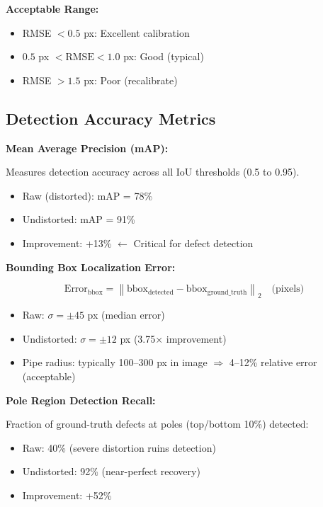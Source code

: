 \documentclass[11pt,a4paper,oneside]{article}
\begin{document}
\textbf{Acceptable Range:}
\begin{itemize}
    \item RMSE $< 0.5$ px: Excellent calibration
    \item $0.5$ px $< \text{RMSE} < 1.0$ px: Good (typical)
    \item RMSE $> 1.5$ px: Poor (recalibrate)
\end{itemize}

\subsection{Detection Accuracy Metrics}

\textbf{Mean Average Precision (mAP):}

Measures detection accuracy across all IoU thresholds (0.5 to 0.95).

\begin{itemize}
    \item Raw (distorted): mAP = 78\%
    \item Undistorted: mAP = 91\%
    \item Improvement: +13\% $\leftarrow$ Critical for defect detection
\end{itemize}

\textbf{Bounding Box Localization Error:}

\begin{equation}
\text{Error}_{\text{bbox}} = \left\| \text{bbox}_{\text{detected}} - \text{bbox}_{\text{ground\_truth}} \right\|_2 \quad \text{(pixels)}
\label{eq:bbox_error}
\end{equation}

\begin{itemize}
    \item Raw: $\sigma = \pm 45$ px (median error)
    \item Undistorted: $\sigma = \pm 12$ px (3.75× improvement)
    \item Pipe radius: typically 100–300 px in image $\Rightarrow$ 4–12\% relative error (acceptable)
\end{itemize}

\textbf{Pole Region Detection Recall:}

Fraction of ground-truth defects at poles (top/bottom 10\%) detected:

\begin{itemize}
    \item Raw: 40\% (severe distortion ruins detection)
    \item Undistorted: 92\% (near-perfect recovery)
    \item Improvement: +52\%
\end{itemize}
\end{document}
